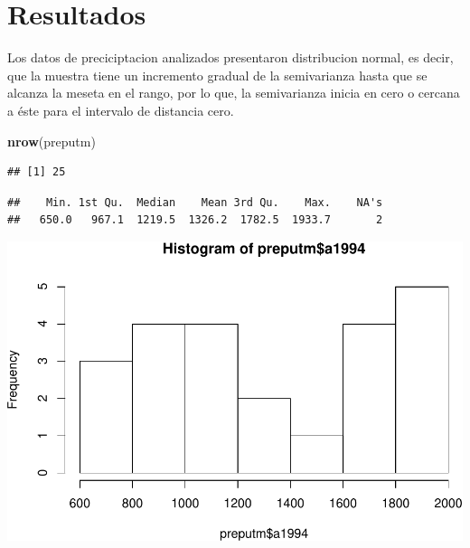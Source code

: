 \documentclass[11pt,]{article}
\newenvironment{Shaded}{\begin{snugshade}}{\end{snugshade}}
\newcommand{\KeywordTok}[1]{\textcolor[rgb]{0.13,0.29,0.53}{\textbf{#1}}}
\newcommand{\OperatorTok}[1]{\textcolor[rgb]{0.81,0.36,0.00}{\textbf{#1}}}
\newcommand{\NormalTok}[1]{#1}
\begin{document}
\section{Resultados}\label{resultados}

Los datos de preciciptacion analizados presentaron distribucion normal,
es decir, que la muestra tiene un incremento gradual de la semivarianza
hasta que se alcanza la meseta en el rango, por lo que, la semivarianza
inicia en cero o cercana a éste para el intervalo de distancia cero.

\begin{Shaded}
\begin{Highlighting}[]
\KeywordTok{nrow}\NormalTok{(preputm)}
\end{Highlighting}
\end{Shaded}

\begin{verbatim}
## [1] 25
\end{verbatim}

\begin{Shaded}
\end{Shaded}

\begin{verbatim}
##    Min. 1st Qu.  Median    Mean 3rd Qu.    Max.    NA's 
##   650.0   967.1  1219.5  1326.2  1782.5  1933.7       2
\end{verbatim}

\begin{Shaded}
\end{Shaded}

\includegraphics{proyecto_files/figure-latex/unnamed-chunk-3-1.pdf}
\end{document}
